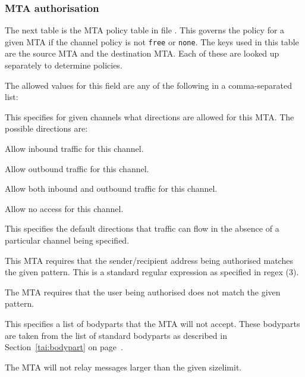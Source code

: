 \subsubsection{MTA authorisation}

The next table is the MTA policy table in file . This
governs the policy for a given MTA if the channel policy is not \verb|free|
or \verb|none|. The keys used in this table are the source MTA and
the destination MTA. Each of these are looked up separately to
determine policies.

The allowed values for this field are any of the following in a 
comma-separated list:
\begin{describe}
\item[\verb|<channel>=<direction>|:]
This specifies for given channels what directions are allowed for this
MTA. The possible directions are:
	\begin{describe}
	\item[\verb|in|:] Allow inbound traffic for this channel.
	\item[\verb|out|:]	Allow outbound traffic for this channel.
	\item[\verb|both|:]	Allow both inbound and outbound
		traffic for this channel.

	\item[\verb|none|:]	Allow no access for this channel.
	\end{describe}

\item[\verb|default=<direction>|:]
This specifies the default directions that traffic can flow in the
absence of a particular channel being specified.

\item[\verb|requires=<pattern>|:]
This MTA requires that the sender/recipient address being authorised
matches the given pattern. This is a standard regular expression as
specified in \man regex (3).

\item[\verb|excludes=<pattern>|:]
The MTA requires that the user being authorised does not match the
given pattern.

\item[\verb|bodypart-excludes=<bodyparts>|:]
This specifies a list of bodyparts that the MTA will not accept.
These bodyparts are taken from the list of standard bodyparts as
described in Section~\ref{tai:bodypart} on page~\pageref{tai:bodypart}.

\item[\verb|sizelimit=<digits>|:]
The MTA will not relay messages larger than the given sizelimit.
\end{describe}

